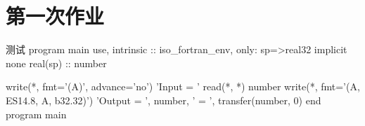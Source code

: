 \section{第一次作业}

\begin{fortran}{测试}
program main
   use, intrinsic :: iso_fortran_env, only: sp=>real32
   implicit none
   real(sp) :: number

   write(*, fmt='(A)', advance='no') 'Input  = '
   read(*, *) number
   write(*, fmt='(A, ES14.8, A, b32.32)') 'Output = ', number, ' = ', transfer(number, 0)
end program main
\end{fortran}
